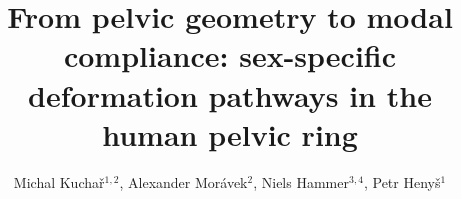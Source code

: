 \documentclass[openacc]{rsproca_new}
\begin{document}
\title{From pelvic geometry to modal compliance: sex-specific deformation pathways in the human pelvic ring}

\author{Michal Kucha\v{r}$^{1,2}$, Alexander Mor\'{a}vek$^{2}$, Niels Hammer$^{3,4}$, Petr Heny\v{s}$^{1}$}

\address{$^{1}$Institute of New Technologies and Applied Informatics, Faculty of Mechatronics, Informatics and Interdisciplinary Studies, Technical University of Liberec, Liberec, Czech Republic\\
$^{2}$Department of Anatomy, Faculty of Medicine in Hradec Kr\'{a}lov\'{e}, Charles University, Hradec Kr\'{a}lov\'{e}, Czech Republic\\
$^{3}$Division of Macroscopic and Clinical Anatomy, Gottfried Schatz Research Center, Medical University of Graz, Graz, Austria\\
$^{4}$Department of Orthopedic and Trauma Surgery, University of Leipzig, Leipzig, Germany; Division of Biomechatronics, Fraunhofer IWU, Dresden, Germany}

\subject{biomechanics, evolutionary anthropology, obstetrics}


\end{document}
